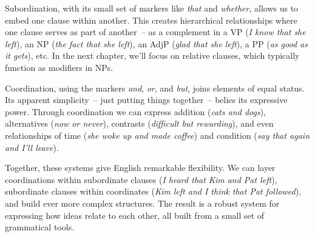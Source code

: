Subordination, with its small set of markers like \textit{that} and \textit{whether}, allows us to embed one clause within another. This creates hierarchical relationships where one clause serves as part of another~-- as a complement in a VP (\textit{I know that she left}), an NP (\textit{the fact that she left}), an AdjP (\textit{glad that she left}), a PP (\textit{as good as it gets}), etc. In the next chapter, we'll focus on relative clauses, which typically function as modifiers in NPs.

Coordination, using the markers \textit{and}, \textit{or}, and \textit{but}, joins elements of equal status. Its apparent simplicity~-- just putting things together~-- belies its expressive power. Through coordination we can express addition (\textit{cats and dogs}), alternatives (\textit{now or never}), contrasts (\textit{difficult but rewarding}), and even relationships of time (\textit{she woke up and made coffee}) and condition (\textit{say that again and I'll leave}).

Together, these systems give English remarkable flexibility. We can layer coordinations within subordinate clauses (\textit{I heard that Kim and Pat left}), subordinate clauses within coordinates (\textit{Kim left and I think that Pat followed}), and build ever more complex structures. The result is a robust system for expressing how ideas relate to each other, all built from a small set of grammatical tools.